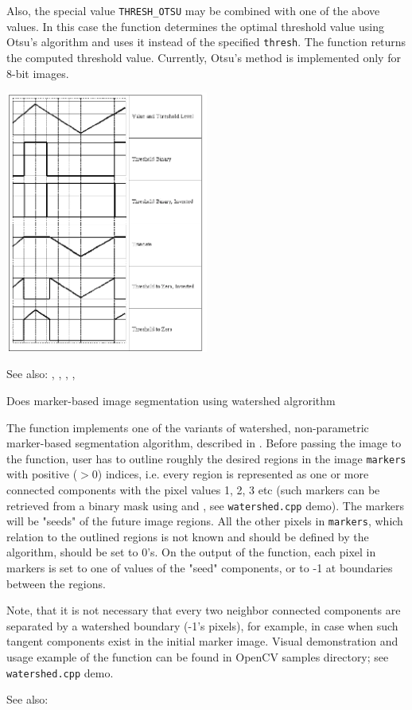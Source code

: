Also, the special value \texttt{THRESH\_OTSU} may be combined with
one of the above values. In this case the function determines the optimal threshold
value using Otsu's algorithm and uses it instead of the specified \texttt{thresh}.
The function returns the computed threshold value.
Currently, Otsu's method is implemented only for 8-bit images.

\includegraphics[width=0.5\textwidth]{pics/threshold.png}

See also: , , , , 

Does marker-based image segmentation using watershed algrorithm

\begin{description}
\end{description}

The function implements one of the variants
of watershed, non-parametric marker-based segmentation algorithm,
described in \cite{Meyer92}. Before passing the image to the
function, user has to outline roughly the desired regions in the image
\texttt{markers} with positive ($>0$) indices, i.e. every region is
represented as one or more connected components with the pixel values
1, 2, 3 etc (such markers can be retrieved from a binary mask
using and , see \texttt{watershed.cpp} demo).
The markers will be "seeds" of the future image
regions. All the other pixels in \texttt{markers}, which relation to the
outlined regions is not known and should be defined by the algorithm,
should be set to 0's. On the output of the function, each pixel in
markers is set to one of values of the "seed" components, or to -1 at
boundaries between the regions.

Note, that it is not necessary that every two neighbor connected
components are separated by a watershed boundary (-1's pixels), for
example, in case when such tangent components exist in the initial
marker image. Visual demonstration and usage example of the function
can be found in OpenCV samples directory; see \texttt{watershed.cpp} demo.

See also: 

\fi

